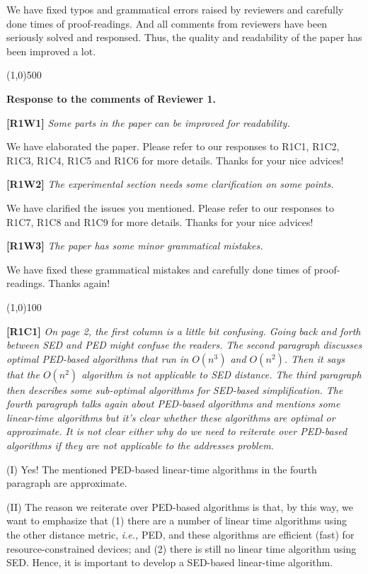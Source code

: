 \documentclass{letter}
\newcommand{\ie}{\emph{i.e.,}\xspace}
\begin{document}
We have fixed typos and grammatical errors raised by reviewers and carefully done times of proof-readings. And all comments from reviewers have been seriously solved and responsed. Thus, the quality and readability of the paper has been improved a lot.

\line(1,0){500}

\textbf{Response to the comments of Reviewer 1.}

\textbf{[R1W1]} \emph{Some parts in the paper can be improved for readability.}

We have elaborated the paper. Please refer to our responses to R1C1, R1C2, R1C3, R1C4, R1C5 and R1C6 for more details. Thanks for your nice advices!

\textbf{[R1W2]} \emph{The experimental section needs some clarification on some points.}

We have clarified the issues you mentioned. Please refer to our responses to R1C7, R1C8 and R1C9 for more details. Thanks for your nice advices!

\textbf{[R1W3]} \emph{The paper has some minor grammatical mistakes.}

We have fixed these grammatical mistakes and carefully done times of proof-readings. Thanks again!

\line(1,0){100}

\textbf{[R1C1]} \emph{On page 2, the first column is a little bit confusing. Going back and forth between SED and PED might confuse the readers. The second paragraph discusses optimal PED-based algorithms that run in $O(n^3)$ and $O(n^2)$. Then it says that the $O(n^2)$ algorithm is not applicable to SED distance. The third paragraph then describes some sub-optimal algorithms for SED-based simplification. {The fourth paragraph talks again about PED-based algorithms and mentions some linear-time algorithms but it's clear whether these algorithms are optimal or approximate. It is not clear either why do we need to reiterate over PED-based algorithms if they are not applicable to the addresses problem.}}

(I) Yes! The mentioned PED-based linear-time algorithms in the fourth paragraph are approximate.

(II) The reason we reiterate over PED-based algorithms is that, by this way, we want to emphasize that (1) there are a number of linear time algorithms using the other distance metric, \ie PED, and these algorithms are efficient (fast) for resource-constrained devices; and (2) there is still no linear time algorithm using SED. Hence, it is important to develop a SED-based linear-time algorithm.
\end{document}
